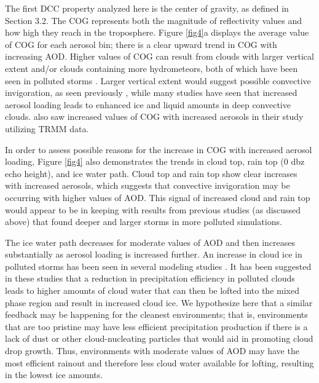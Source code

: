 The first DCC property analyzed here is the center of gravity, as defined in Section 3.2.  The COG represents both the magnitude of reflectivity values and how high they reach in the troposphere.  Figure \ref{fig4}a displays the average value of COG for each aerosol bin; there is a clear upward trend in COG with increasing AOD.  Higher values of COG can result from clouds with larger vertical extent and/or clouds containing more hydrometeors, both of which have been seen in polluted storms \citep[as summarized in][]{taoreview}.  Larger vertical extent would suggest possible convective invigoration, as seen previously \citep{Andreae:2004p32,Khain:2005p71,vandenHeever:2006p1147,vandenHeever:2007p53,Lee:2008p3014,Rosenfeld:2008p24,Lebo:2011p8933, rcepaper}, while many studies \citep{Lynn:2005p29, Khain:2005p71,vandenHeever:2006p1147, VanDenHeever:2011p7996, Storer:2010p8001,rcepaper} have seen that increased aerosol loading leads to enhanced ice and liquid amounts in deep convective clouds.  \citet{Heiblum:2012p8926} also saw increased values of COG with increased aerosols in their study utilizing TRMM data.

In order to assess possible reasons for the increase in COG with increased aerosol loading, Figure \ref{fig4} also demonstrates the trends in cloud top, rain top (0 dbz echo height), and ice water path.  Cloud top and rain top show clear increases with increased aerosols, which suggests that convective invigoration may be occurring with higher values of AOD.  This signal of increased cloud and rain top would appear to be in keeping with results from previous studies (as discussed above) that found deeper and larger storms in more polluted simulations.

The ice water path decreases for moderate values of AOD and then increases substantially as aerosol loading is increased further.  An increase in cloud ice in polluted storms has been seen in several modeling studies  \citep{Lynn:2005p29, Khain:2005p71,vandenHeever:2006p1147, VanDenHeever:2011p7996,Rosenfeld:2008p24,Storer:2010p8001,rcepaper}.  It has been suggested in these studies that a reduction in precipitation efficiency in polluted clouds leads to higher amounts of cloud water that can then be lofted into the mixed phase region and result in increased cloud ice.   We hypothesize here that a similar feedback may be happening for the cleanest environments; that is, environments that are too pristine may have less efficient precipitation production if there is a lack of dust or other cloud-nucleating particles that would aid in promoting cloud drop growth.  Thus, environments with moderate values of AOD may have the most efficient rainout and therefore less cloud water available for lofting, resulting in the lowest ice amounts.

